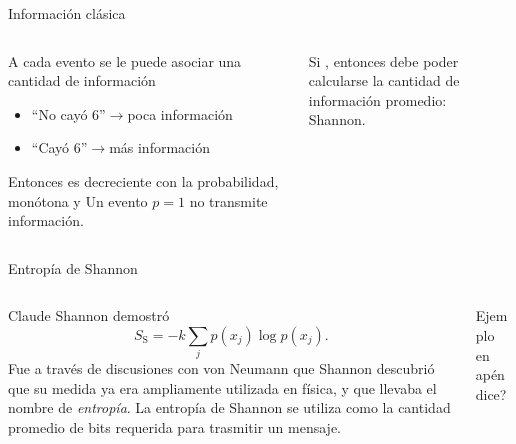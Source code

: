 \begin{frame}{Información clásica}
    \begin{columns}
        \begin{column}{0.5\textwidth}
            \begin{center}
                A cada evento se le puede asociar una cantidad de información\pause
            \end{center}
            \begin{itemize}
                \item ``No cayó 6''$\rightarrow$poca información\pause
                \item ``Cayó 6''$\rightarrow$más información\pause
            \end{itemize}
            Entonces es decreciente con la probabilidad, monótona y Un evento $p=1$ no transmite información.
        \end{column}
        \pause
        \begin{column}{0.5\textwidth}
            Si , entonces debe poder calcularse la cantidad de información promedio:\\
            \pause
            Shannon.
        \end{column}
    \end{columns}
\end{frame}

\begin{frame}{Entropía de Shannon}
    \begin{columns}
        \begin{column}{0.5\textwidth}
            Claude Shannon demostró 
            \begin{equation}
                S_{\text{S}}=-k\sum_{j}p(x_{j})\log{p(x_{j})}.\nonumber
            \end{equation}
            Fue a través de discusiones con von Neumann que Shannon descubrió que su medida ya era ampliamente utilizada en física, y que llevaba el nombre de \textit{entropía}.   
            La entropía de Shannon se utiliza como la cantidad promedio de bits requerida para trasmitir un mensaje.
        \end{column}
        \begin{column}{0.5\textwidth}
            Ejemplo en apéndice?
        \end{column}
    \end{columns}
\end{frame}



